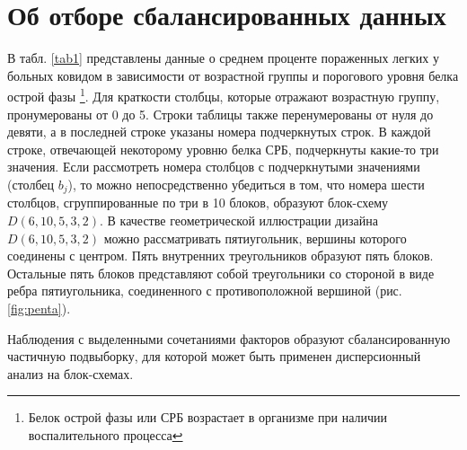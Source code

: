 \documentclass{math-mech-sci}
\begin{document}
	\section{Об отборе сбалансированных данных }


В табл.	\ref{tab1} представлены данные о среднем проценте пораженных легких у больных ковидом в зависимости от возрастной группы и порогового уровня белка острой фазы \footnote{Белок острой фазы или СРБ возрастает в организме при наличии воспалительного процесса}. Для краткости столбцы, которые отражают возрастную группу, пронумерованы от 0 до 5. Строки таблицы также  перенумерованы от нуля до девяти, а в последней строке указаны номера подчеркнутых строк. В каждой строке, отвечающей некоторому уровню белка СРБ, подчеркнуты какие-то три значения. Если рассмотреть  номера столбцов с подчеркнутыми значениями (столбец  $b_j$), то можно непосредственно убедиться в том, что номера шести столбцов, сгруппированные по три в 10 блоков, образуют блок-схему $D(6,10,5,3,2)$.  
%
В качестве геометрической иллюстрации   дизайна  $D(6,10,5,3,2)$ можно рассматривать пятиугольник, вершины которого соединены с центром. Пять внутренних треугольников образуют пять блоков. Остальные пять блоков представляют собой треугольники со стороной в виде ребра пятиугольника, соединенного с противоположной вершиной (рис. \ref{fig:penta}).  
%


Наблюдения с выделенными  сочетаниями факторов образуют сбалансированную частичную подвыборку,  для которой может  быть применен   дисперсионный анализ на блок-схемах. 
\end{document}
